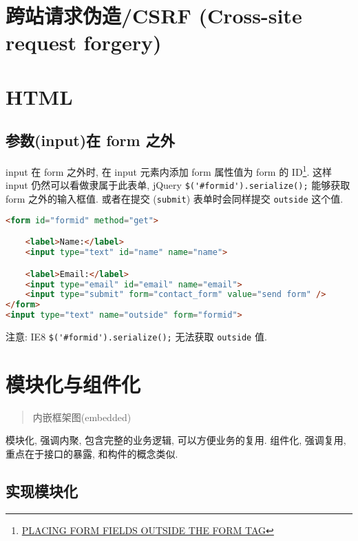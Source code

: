 \section{跨站请求伪造/CSRF (Cross-site request
forgery)}\label{ux8de8ux7ad9ux8bf7ux6c42ux4f2aux9020csrf-cross-site-request-forgery}

\section{HTML}\label{html}

\subsection{参数(input)在 form
之外}\label{ux53c2ux6570inputux5728-form-ux4e4bux5916}

input 在 form 之外时, 在 input 元素内添加 form 属性值为 form 的
ID\footnote{\href{http://www.dreamdealer.nl/articles/form_fields_outside_a_form.html}{PLACING
  FORM FIELDS OUTSIDE THE FORM TAG}}. 这样 input
仍然可以看做隶属于此表单, jQuery \lstinline!$('#formid').serialize();!
能够获取 form 之外的输入框值. 或者在提交 (\lstinline!submit!)
表单时会同样提交 \lstinline!outside! 这个值.

\begin{lstlisting}[language=HTML]
<form id="formid" method="get">

    <label>Name:</label>
    <input type="text" id="name" name="name">

    <label>Email:</label>
    <input type="email" id="email" name="email">
    <input type="submit" form="contact_form" value="send form" />
</form>
<input type="text" name="outside" form="formid">
\end{lstlisting}

注意: IE8 \lstinline!$('#formid').serialize();! 无法获取
\lstinline!outside! 值.

\section{模块化与组件化}\label{ux6a21ux5757ux5316ux4e0eux7ec4ux4ef6ux5316}

\begin{quote}
内嵌框架图(embedded)
\end{quote}

模块化, 强调内聚, 包含完整的业务逻辑, 可以方便业务的复用. 组件化,
强调复用, 重点在于接口的暴露, 和构件的概念类似.

\subsection{实现模块化}\label{ux5b9eux73b0ux6a21ux5757ux5316}

